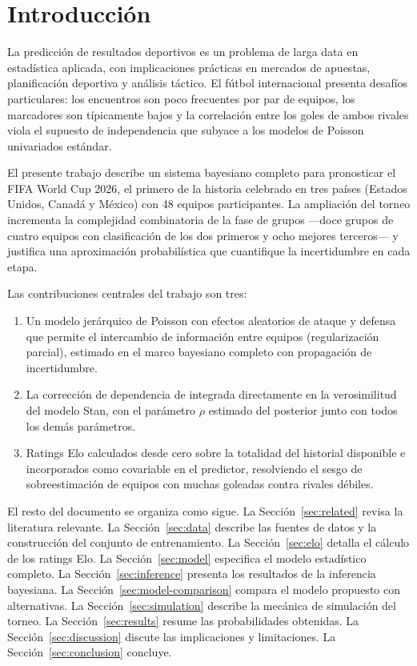\documentclass[12pt,a4paper]{article}
\begin{document}
\newpage
\tableofcontents
\newpage

\section{Introducción}
\label{sec:intro}

La predicción de resultados deportivos es un problema de larga data en
estadística aplicada, con implicaciones prácticas en mercados de apuestas,
planificación deportiva y análisis táctico.
El fútbol internacional presenta desafíos particulares: los encuentros son poco
frecuentes por par de equipos, los marcadores son típicamente bajos y la
correlación entre los goles de ambos rivales viola el supuesto de independencia
que subyace a los modelos de Poisson univariados estándar.

El presente trabajo describe un sistema bayesiano completo para pronosticar el
FIFA World Cup 2026, el primero de la historia celebrado en tres países
(Estados Unidos, Canadá y México) con 48 equipos participantes.
La ampliación del torneo incrementa la complejidad combinatoria de la fase de
grupos —doce grupos de cuatro equipos con clasificación de los dos primeros y
ocho mejores terceros— y justifica una aproximación probabilística que cuantifique
la incertidumbre en cada etapa.

Las contribuciones centrales del trabajo son tres:
\begin{enumerate}
  \item Un modelo jerárquico de Poisson con efectos aleatorios de ataque y defensa
        que permite el intercambio de información entre equipos (regularización parcial),
        estimado en el marco bayesiano completo con propagación de incertidumbre.
  \item La corrección de dependencia de \citet{dixon1997modelling} integrada
        directamente en la verosimilitud del modelo Stan, con el parámetro $\rho$
        estimado del posterior junto con todos los demás parámetros.
  \item Ratings Elo calculados desde cero sobre la totalidad del historial disponible
        e incorporados como covariable en el predictor, resolviendo el sesgo de
        sobreestimación de equipos con muchas goleadas contra rivales débiles.
\end{enumerate}

El resto del documento se organiza como sigue.
La Sección~\ref{sec:related} revisa la literatura relevante.
La Sección~\ref{sec:data} describe las fuentes de datos y la construcción del
conjunto de entrenamiento.
La Sección~\ref{sec:elo} detalla el cálculo de los ratings Elo.
La Sección~\ref{sec:model} especifica el modelo estadístico completo.
La Sección~\ref{sec:inference} presenta los resultados de la inferencia bayesiana.
La Sección~\ref{sec:model-comparison} compara el modelo propuesto con alternativas.
La Sección~\ref{sec:simulation} describe la mecánica de simulación del torneo.
La Sección~\ref{sec:results} resume las probabilidades obtenidas.
La Sección~\ref{sec:discussion} discute las implicaciones y limitaciones.
La Sección~\ref{sec:conclusion} concluye.
\end{document}
